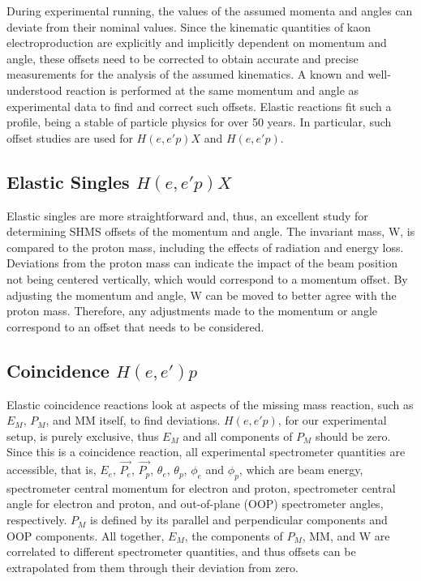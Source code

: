 \documentclass[
]{report}
\begin{document}


\label{Chapter-3-5}

During experimental running, the values of the assumed momenta and
angles can deviate from their nominal values. Since the kinematic
quantities of kaon electroproduction are explicitly and implicitly
dependent on momentum and angle, these offsets need to be corrected to
obtain accurate and precise measurements for the analysis of the assumed
kinematics. A known and well-understood reaction is performed at the
same momentum and angle as experimental data to find and correct such
offsets. Elastic reactions fit such a profile, being a stable of
particle physics for over 50 years. In particular, such offset studies
are used for \(H(e,e'p)X\) and \(H(e, e'p)\).

\hypertarget{elastic-singles-he-epx}{%
\subsection{\texorpdfstring{Elastic Singles
\(H(e, e'p)X\)}{Elastic Singles H(e, e\textquotesingle p)X}}\label{elastic-singles-he-epx}}

Elastic singles are more straightforward and, thus, an excellent study
for determining SHMS offsets of the momentum and angle. The invariant
mass, W, is compared to the proton mass, including the effects of
radiation and energy loss. Deviations from the proton mass can indicate
the impact of the beam position not being centered vertically, which
would correspond to a momentum offset. By adjusting the momentum and
angle, W can be moved to better agree with the proton mass. Therefore,
any adjustments made to the momentum or angle correspond to an offset
that needs to be considered.

\hypertarget{coincidence-heep}{%
\subsection{\texorpdfstring{Coincidence
\(H(e,e')p\)}{Coincidence H(e,e\textquotesingle)p}}\label{coincidence-heep}}



Elastic coincidence reactions look at aspects of the missing mass
reaction, such as \(E_M\), \(P_M\), and MM itself, to find deviations.
\(H(e,e'p)\), for our experimental setup, is purely exclusive, thus
\(E_M\) and all components of \(P_M\) should be zero. Since this is a
coincidence reaction, all experimental spectrometer quantities are
accessible, that is, \(E_e\), \(\vec{P_e}\), \(\vec{P_p}\),
\(\theta_e\), \(\theta_p\), \(\phi_e\) and \(\phi_p\), which are beam
energy, spectrometer central momentum for electron and proton,
spectrometer central angle for electron and proton, and out-of-plane
(OOP) spectrometer angles, respectively. \(P_M\) is defined by its
parallel and perpendicular components and OOP components. All together,
\(E_M\), the components of \(P_M\), MM, and W are correlated to
different spectrometer quantities, and thus offsets can be extrapolated
from them through their deviation from zero.
\end{document}
